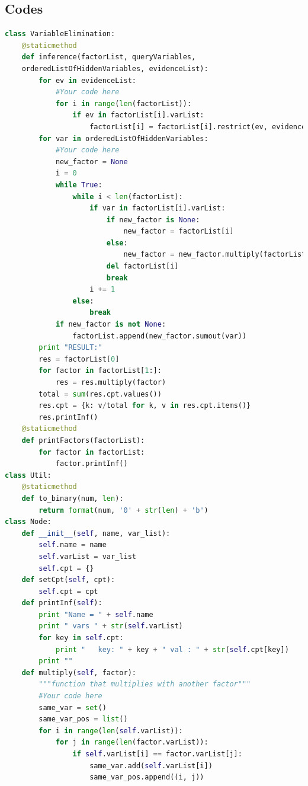 \documentclass[a4paper, 11pt]{article}
\begin{document}
\subsection{Codes}
\begin{lstlisting}[language=Python,frame=single]
class VariableElimination:
    @staticmethod
    def inference(factorList, queryVariables, 
    orderedListOfHiddenVariables, evidenceList):
        for ev in evidenceList:
            #Your code here
            for i in range(len(factorList)):
                if ev in factorList[i].varList:
                    factorList[i] = factorList[i].restrict(ev, evidenceList[ev])
        for var in orderedListOfHiddenVariables:
            #Your code here
            new_factor = None
            i = 0
            while True:
                while i < len(factorList):
                    if var in factorList[i].varList:
                        if new_factor is None:
                            new_factor = factorList[i]
                        else:
                            new_factor = new_factor.multiply(factorList[i])
                        del factorList[i]
                        break
                    i += 1
                else:
                    break
            if new_factor is not None:
                factorList.append(new_factor.sumout(var))
        print "RESULT:"
        res = factorList[0]
        for factor in factorList[1:]:
            res = res.multiply(factor)
        total = sum(res.cpt.values())
        res.cpt = {k: v/total for k, v in res.cpt.items()}
        res.printInf()
    @staticmethod
    def printFactors(factorList):
        for factor in factorList:
            factor.printInf()
class Util:
    @staticmethod
    def to_binary(num, len):
        return format(num, '0' + str(len) + 'b')
class Node:
    def __init__(self, name, var_list):
        self.name = name
        self.varList = var_list
        self.cpt = {}
    def setCpt(self, cpt):
        self.cpt = cpt
    def printInf(self):
        print "Name = " + self.name
        print " vars " + str(self.varList)
        for key in self.cpt:
            print "   key: " + key + " val : " + str(self.cpt[key])
        print ""
    def multiply(self, factor):
        """function that multiplies with another factor"""
        #Your code here
        same_var = set()
        same_var_pos = list()
        for i in range(len(self.varList)):
            for j in range(len(factor.varList)):
                if self.varList[i] == factor.varList[j]:
                    same_var.add(self.varList[i])
                    same_var_pos.append((i, j))

\end{lstlisting}
\end{document}
